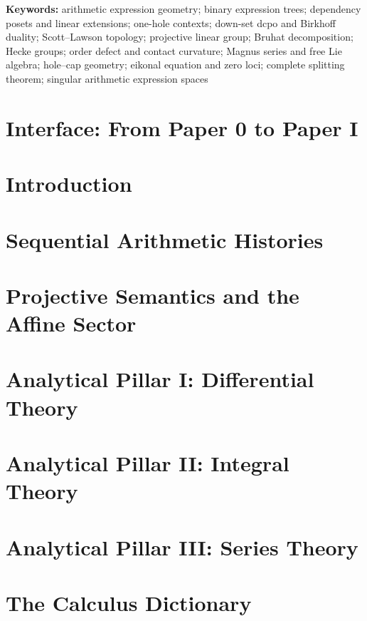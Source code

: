 \documentclass[11pt]{article}
\theoremstyle{definition}
\theoremstyle{remark}
\begin{document}
\noindent\textbf{Keywords:}
arithmetic expression geometry; binary expression trees; dependency posets and
linear extensions; one-hole contexts; down-set dcpo and Birkhoff duality;
Scott--Lawson topology; projective linear group; Bruhat decomposition; Hecke
groups; order defect and contact curvature; Magnus series and free Lie algebra;
hole--cap geometry; eikonal equation and zero loci; complete splitting theorem;
singular arithmetic expression spaces

\setcounter{tocdepth}{2}
\tableofcontents
\newpage

\section*{Interface: From Paper 0 to Paper I}


\section{Introduction}\label{sec:introduction}

\section{Sequential Arithmetic Histories}\label{sec:sequential-histories}

\section{Projective Semantics and the Affine Sector}\label{sec:projective-affine}

\section{Analytical Pillar I: Differential Theory}\label{sec:differential-theory}

\section{Analytical Pillar II: Integral Theory}\label{sec:integral-theory}

\section{Analytical Pillar III: Series Theory}\label{sec:series-theory}

\section{The Calculus Dictionary}\label{sec:calculus-dictionary}

\end{document}
